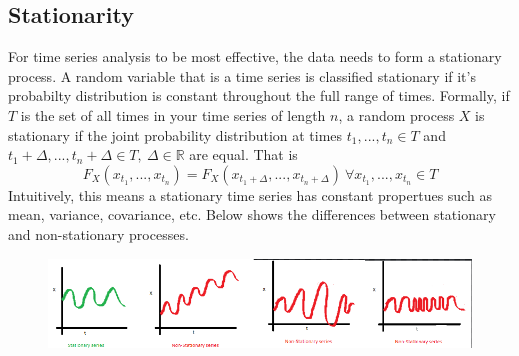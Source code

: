 \documentclass{article}
\begin{document}
  \subsection{Stationarity}
  For time series analysis to be most effective, the data needs to form a stationary process. 
  A random variable that is a time series is classified stationary if it's probabilty distribution is constant throughout the full range of times. 
  Formally, if $T$ is the set of all times in your time series of length $n$, a random process $X$ is stationary if the joint probability distribution at times $t_1,...,t_n \in T$ and $t_1+\Delta,...,t_n+\Delta \in T,\  \Delta \in \mathbb{R}$ are equal. That is
  \begin{equation*}
    F_{X}(x_{t_1},...,x_{t_n}) = F_{X}(x_{{t_1}+\Delta},...,x_{{t_n}+\Delta})\ \forall x_{t_1},...,x_{t_n} \in T
  \end{equation*}
  Intuitively, this means a stationary time series has constant propertues such as mean, variance, covariance, etc. Below shows the differences between stationary and non-stationary processes.
  \begin{figure}[H]
    \includegraphics[width=\linewidth]{stationary_time_series.png}
  \end{figure}
\end{document}
